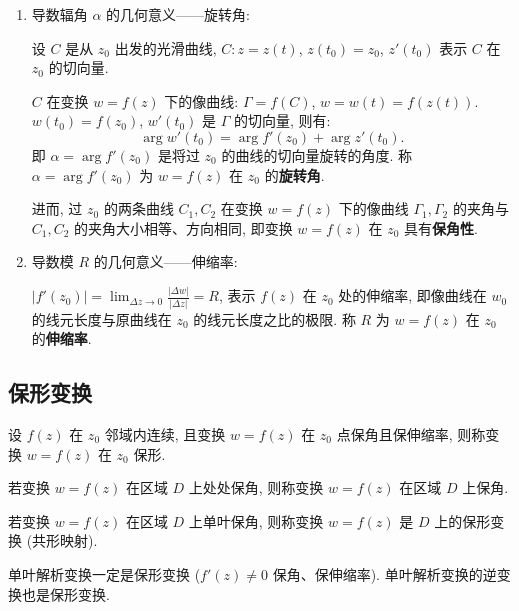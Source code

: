 \documentclass[theorem=false,mathfont=none,openany,sub3section]{easybook}
\begin{document}
\begin{enumerate}
  \item 导数辐角 $\alpha$ 的几何意义——旋转角:\par
  设 $C$ 是从 $z_{0}$ 出发的光滑曲线, $C:z=z(t)$, $z(t_{0})=z_{0}$, $z'(t_{0})$ 表示 $C$ 在 $z_{0}$ 的切向量.\par
  $C$ 在变换 $w=f(z)$ 下的像曲线: $\Gamma=f(C)$, $w=w(t)=f(z(t))$. $w(t_{0})=f(z_{0})$, $w'(t_{0})$ 是 $\Gamma$ 的切向量, 则有:
  \[
  \arg w'(t_{0})=\arg f'(z_{0})+\arg z'(t_{0}).
  \]
  即 $\alpha=\arg f'(z_{0})$ 是将过 $z_{0}$ 的曲线的切向量旋转的角度. 称 $\alpha=\arg f'(z_{0})$ 为 $w=f(z)$ 在 $z_{0}$ 的\textbf{旋转角}.

  进而, 过 $z_{0}$ 的两条曲线 $C_{1},C_{2}$ 在变换 $w=f(z)$ 下的像曲线 $\Gamma_{1},\Gamma_{2}$ 的夹角与 $C_{1},C_{2}$ 的夹角大小相等、方向相同, 即变换 $w=f(z)$ 在 $z_{0}$ 具有\textbf{保角性}.

  \item 导数模 $R$ 的几何意义——伸缩率:\par
  $|f'(z_{0})|=\lim_{\Delta z\to0}\frac{|\Delta w|}{|\Delta z|}=R$, 表示 $f(z)$ 在 $z_{0}$ 处的伸缩率, 即像曲线在 $w_{0}$ 的线元长度与原曲线在 $z_{0}$ 的线元长度之比的极限. 称 $R$ 为 $w=f(z)$ 在 $z_{0}$ 的\textbf{伸缩率}.
\end{enumerate}

\subsection{保形变换}

\begin{definition}
  设 $f(z)$ 在 $z_{0}$ 邻域内连续, 且变换 $w=f(z)$ 在 $z_{0}$ 点保角且保伸缩率, 则称变换 $w=f(z)$ 在 $z_{0}$ 保形.
\end{definition}

\begin{definition}
  若变换 $w=f(z)$ 在区域 $D$ 上处处保角, 则称变换 $w=f(z)$ 在区域 $D$ 上保角.
\end{definition}

\begin{definition}
  若变换 $w=f(z)$ 在区域 $D$ 上单叶保角, 则称变换 $w=f(z)$ 是 $D$ 上的保形变换 (共形映射).
\end{definition}

\begin{theorem}
  单叶解析变换一定是保形变换 ($f'(z)\neq0$ 保角、保伸缩率). 单叶解析变换的逆变换也是保形变换.
\end{theorem}
\end{document}
